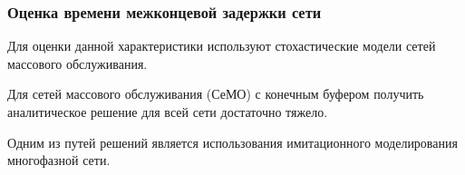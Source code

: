 





   


\begin{frame}
    \justifying
    \frametitle{Оценка времени межконцевой задержки сети}
    \fontsize{8pt}{7.2}\selectfont


    Для оценки данной характеристики используют стохастические модели сетей массового обслуживания.

    \bigskip

    Для сетей массового обслуживания (СеМО) с конечным буфером получить аналитическое решение для всей сети достаточно тяжело.

    \bigskip

    Одним из путей решений является использования имитационного моделирования многофазной сети.

\end{frame}

